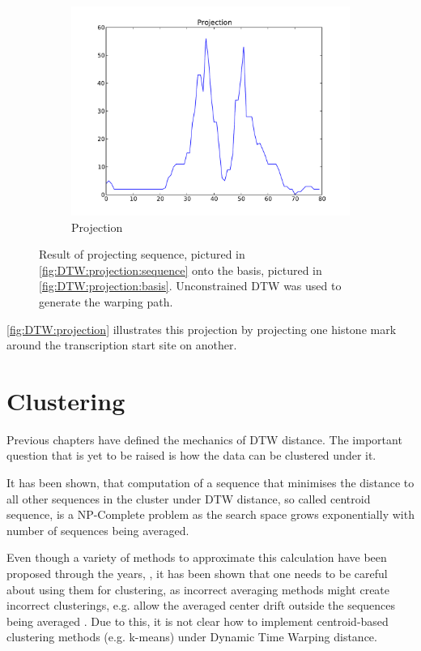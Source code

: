 \documentclass[parskip]{cs4rep}
\begin{document}
\begin{figure}[t,b]
\begin{subfigure}[b]{0.31\textwidth}
       \centering
       \includegraphics[width=\textwidth]{figures/DTW/projection.pdf}
       \caption{Projection}
       \label{fig:DTW:projection:projection}
   \end{subfigure}
   \caption{Result of projecting sequence, pictured in \ref{fig:DTW:projection:sequence} onto the basis, pictured in \ref{fig:DTW:projection:basis}. Unconstrained DTW was used to generate the warping path.}
   \label{fig:DTW:projection}
\end{figure}

\autoref{fig:DTW:projection} illustrates this projection by projecting one histone mark around the transcription start site on another.


\section{Clustering}
\label{sec:clustering}

Previous chapters have defined the mechanics of DTW distance. The important question that is yet to be raised is how the data can be clustered under it. 

It has been shown, that computation of a sequence that minimises the distance to all other sequences in the cluster under DTW distance, so called centroid sequence, is a NP-Complete problem as the search space grows exponentially with number of sequences being averaged\cite{Hautamaki:2008fh,Petitjean:2012bp}.

Even though a variety of methods to approximate this calculation have been proposed through the years, \cite{Gupta:1996tw,Niennattrakul:2009ep,Petitjean:2011bq,Petitjean:2012bp}, it has been shown that one needs to be careful about using them for clustering, as incorrect averaging methods might create incorrect clusterings, e.g. allow the averaged center drift outside the sequences being averaged \cite{Niennattrakul:2007wv}. Due to this, it is not clear how to implement centroid-based clustering methods (e.g. k-means) under Dynamic Time Warping distance. 
\end{document}
